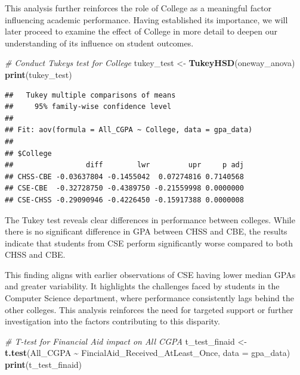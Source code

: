 \documentclass[
  12pt,
]{article}
\newenvironment{Shaded}{\begin{snugshade}}{\end{snugshade}}
\newcommand{\AttributeTok}[1]{\textcolor[rgb]{0.13,0.29,0.53}{#1}}
\newcommand{\CommentTok}[1]{\textcolor[rgb]{0.56,0.35,0.01}{\textit{#1}}}
\newcommand{\FunctionTok}[1]{\textcolor[rgb]{0.13,0.29,0.53}{\textbf{#1}}}
\newcommand{\NormalTok}[1]{#1}
\newcommand{\OtherTok}[1]{\textcolor[rgb]{0.56,0.35,0.01}{#1}}
\newcommand{\SpecialCharTok}[1]{\textcolor[rgb]{0.81,0.36,0.00}{\textbf{#1}}}
\begin{document}
This analysis further reinforces the role of College as a meaningful
factor influencing academic performance. Having established its
importance, we will later proceed to examine the effect of College in
more detail to deepen our understanding of its influence on student
outcomes.

\begin{Shaded}
\begin{Highlighting}[]
\CommentTok{\# Conduct Tukey\textquotesingle{}s test for College}
\NormalTok{tukey\_test }\OtherTok{\textless{}{-}} \FunctionTok{TukeyHSD}\NormalTok{(oneway\_anova)}
\FunctionTok{print}\NormalTok{(tukey\_test)}
\end{Highlighting}
\end{Shaded}

\begin{verbatim}
##   Tukey multiple comparisons of means
##     95% family-wise confidence level
## 
## Fit: aov(formula = All_CGPA ~ College, data = gpa_data)
## 
## $College
##                 diff        lwr         upr     p adj
## CHSS-CBE -0.03637804 -0.1455042  0.07274816 0.7140568
## CSE-CBE  -0.32728750 -0.4389750 -0.21559998 0.0000000
## CSE-CHSS -0.29090946 -0.4226450 -0.15917388 0.0000008
\end{verbatim}

The Tukey test reveals clear differences in performance between
colleges. While there is no significant difference in GPA between CHSS
and CBE, the results indicate that students from CSE perform
significantly worse compared to both CHSS and CBE.

This finding aligns with earlier observations of CSE having lower median
GPAs and greater variability. It highlights the challenges faced by
students in the Computer Science department, where performance
consistently lags behind the other colleges. This analysis reinforces
the need for targeted support or further investigation into the factors
contributing to this disparity.

\begin{Shaded}
\begin{Highlighting}[]
\CommentTok{\# T{-}test for Financial Aid impact on All CGPA}
\NormalTok{t\_test\_finaid }\OtherTok{\textless{}{-}} \FunctionTok{t.test}\NormalTok{(All\_CGPA }\SpecialCharTok{\textasciitilde{}}\NormalTok{ FincialAid\_Received\_AtLeast\_Once, }\AttributeTok{data =}\NormalTok{ gpa\_data)}
\FunctionTok{print}\NormalTok{(t\_test\_finaid)}
\end{Highlighting}
\end{Shaded}
\end{document}
